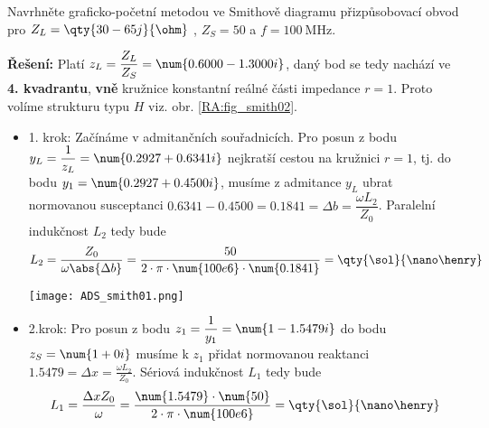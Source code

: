 \begin{example}
  Navrhněte graficko-početní metodou ve Smithově diagramu přizpůsobovací obvod pro 
  \(Z_L = \qty{30 - 65j}{\ohm}\) , \(Z_S = 50\)  a \(f = \qty{100}{\MHz}\).
  
  \textbf{Řešení:}
  Platí \(z_L = \dfrac{Z_L}{Z_S} = \num{0.6000 - 1.3000i}\), daný bod se tedy nachází ve 
  \textbf{4. kvadrantu}, \textbf{vně} kružnice konstantní reálné části impedance \(r = 
  1\). Proto volíme strukturu typu \(H\) viz. obr. \ref{RA:fig_smith02}. 
  \newline
  \begin{itemize}
    \item 1. krok: Začínáme v admitančních souřadnicích. Pro posun z bodu \(y_L = 
          \dfrac{1}{z_L} = \num{0.2927 + 0.6341i}\) nejkratší cestou na kružnici \(r = 1\), 
          tj. do bodu \(y_1 = \num{0.2927 + 0.4500i}\), musíme z admitance \(y_L\) ubrat 
          normovanou susceptanci \(\num{0.6341} - \num{0.4500} = \num{0.1841} = \Delta b = 
          \dfrac{\omega L_2}{Z_0}\). Paralelní indukčnost \(L_2\) tedy bude
          \ROUND[2]{\nmbrE}{\sol}
          \begin{equation*}
            L_2 = \frac{Z_0}{\omega\abs{\Delta b}} = 
                  \frac{50}{2\cdot\pi\cdot\num{100e6}\cdot\num{0.1841}} = \qty{\sol}{\nano\henry}
          \end{equation*}
    
           {\centering   %
            \captionsetup{type=figure}
            \texttt{[image: ADS\_smith01.png]}
            \label{RA:fig_ADS_smith01} 
            \par}
          
    \item 2.krok: Pro posun z bodu \(z_1 = \dfrac{1}{y_1} = \num{1 - 1.5479i}\) do bodu 
          \(z_S = \num{1 + 0i}\) musíme k \(z_1\) přidat normovanou reaktanci \(1.5479 = \Delta 
          x = \frac{\omega L_2}{Z_0}\). Sériová indukčnost \(L_1\) tedy bude
          \DIVIDE{\nmbrC}{\nmbrB}{\nmbrD}
          \ROUND[2]{\nmbrE}{\sol}
          \begin{equation*}
            L_1 = \frac{\Delta x Z_0}{\omega} = 
                  \frac{\num{1.5479}\cdot\num{50}}{2\cdot\pi\cdot\num{100e6}} = 
                  \qty{\sol}{\nano\henry}
          \end{equation*}
           

\end{itemize}
\end{example}
